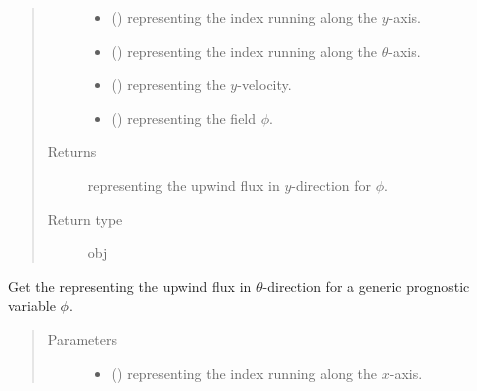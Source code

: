 \documentclass[letterpaper,10pt,english]{sphinxmanual}
\begin{document}
\begin{fulllineitems}
\begin{fulllineitems}
\begin{quote}
\begin{description}
\begin{itemize}
\item {} 
 () \textendash{}  representing the index running along the \(y\)-axis.

\item {} 
 () \textendash{}  representing the index running along the \(\theta\)-axis.

\item {} 
 () \textendash{}  representing the \(y\)-velocity.

\item {} 
 () \textendash{}  representing the field \(\phi\).

\end{itemize}

\item[{Returns}] \leavevmode
{} representing the upwind flux in \(y\)-direction for \(\phi\).

\item[{Return type}] \leavevmode
obj

\end{description}\end{quote}

\end{fulllineitems}


\begin{fulllineitems}
\label{\detokenize{api:tasmania.dycore.flux_isentropic_upwind.FluxIsentropicUpwind._get_upwind_flux_z}}
Get the  representing the upwind flux in \(\theta\)-direction
for a generic prognostic variable \(\phi\).
\begin{quote}\begin{description}
\item[{Parameters}] \leavevmode\begin{itemize}
\item {} 
 () \textendash{}  representing the index running along the \(x\)-axis.


\end{itemize}
\end{description}
\end{quote}
\end{fulllineitems}
\end{fulllineitems}
\end{document}
